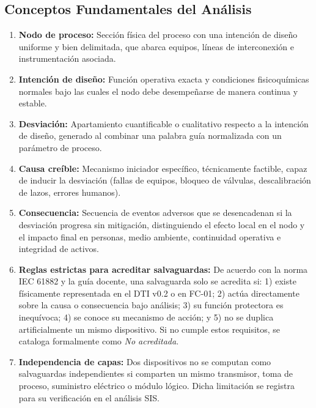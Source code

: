 \documentclass[10pt,letterpaper]{article}
\begin{document}
\subsection{Conceptos Fundamentales del Análisis}
\begin{enumerate}[leftmargin=*]
    \item \textbf{Nodo de proceso:} Sección física del proceso con una intención de diseño uniforme y bien delimitada, que abarca equipos, líneas de interconexión e instrumentación asociada.
    \item \textbf{Intención de diseño:} Función operativa exacta y condiciones fisicoquímicas normales bajo las cuales el nodo debe desempeñarse de manera continua y estable.
    \item \textbf{Desviación:} Apartamiento cuantificable o cualitativo respecto a la intención de diseño, generado al combinar una palabra guía normalizada con un parámetro de proceso.
    \item \textbf{Causa creíble:} Mecanismo iniciador específico, técnicamente factible, capaz de inducir la desviación (fallas de equipos, bloqueo de válvulas, descalibración de lazos, errores humanos).
    \item \textbf{Consecuencia:} Secuencia de eventos adversos que se desencadenan si la desviación progresa sin mitigación, distinguiendo el efecto local en el nodo y el impacto final en personas, medio ambiente, continuidad operativa e integridad de activos.
    \item \textbf{Reglas estrictas para acreditar salvaguardas:} De acuerdo con la norma IEC 61882 y la guía docente, una salvaguarda solo se acredita si: 1) existe físicamente representada en el DTI v0.2 o en FC-01; 2) actúa directamente sobre la causa o consecuencia bajo análisis; 3) su función protectora es inequívoca; 4) se conoce su mecanismo de acción; y 5) no se duplica artificialmente un mismo dispositivo. Si no cumple estos requisitos, se cataloga formalmente como \textit{No acreditada}.
    \item \textbf{Independencia de capas:} Dos dispositivos no se computan como salvaguardas independientes si comparten un mismo transmisor, toma de proceso, suministro eléctrico o módulo lógico. Dicha limitación se registra para su verificación en el análisis SIS.
\end{enumerate}
\end{document}
